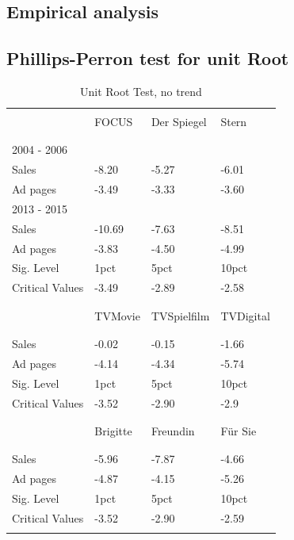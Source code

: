 \documentclass[12pt,a4paper,notitlepage]{article}
\begin{document}
\begin{appendices}

\section{Empirical analysis}

\subsection{Phillips-Perron test for unit Root}


\begin{table}[!htbp]\centering 
  \caption{Unit Root Test, no trend} 
  \label{tab_uroot} 
\begin{tabular}{@{\extracolsep{5pt}} llll} 
\\[-1.8ex]\hline 
\hline \\[-1.8ex] 
 & FOCUS & Der Spiegel & Stern \\ 
\\[-1.8ex]\hline 
\hline \\[-1.8ex] 
2004 - 2006 \\
\hline
Sales & -8.20 & -5.27 & -6.01 \\ 
Ad pages & -3.49 & -3.33 & -3.60 \\ 
\hline
2013 - 2015 \\
\hline
Sales & -10.69 & -7.63 & -8.51 \\ 
Ad pages & -3.83 & -4.50 & -4.99 \\ 
\hline
Sig. Level & 1pct & 5pct & 10pct \\ 
Critical Values & -3.49 & -2.89 & -2.58 \\ 
\\[-1.8ex]\hline 
\hline \\[-1.8ex] 
 & TVMovie & TVSpielfilm & TVDigital \\ 
\\[-1.8ex]\hline 
\hline \\[-1.8ex] 
Sales & -0.02 & -0.15 & -1.66 \\ 
Ad pages & -4.14 & -4.34 & -5.74 \\
\hline 
Sig. Level & 1pct & 5pct & 10pct \\ 
Critical Values & -3.52 & -2.90 & -2.9 \\ 
\\[-1.8ex]\hline 
\hline \\[-1.8ex] 
 & Brigitte & Freundin & Für Sie \\ 
\\[-1.8ex]\hline 
\hline \\[-1.8ex] 
Sales & -5.96 & -7.87 & -4.66 \\ 
Ad pages & -4.87 & -4.15 & -5.26 \\ 
\hline
Sig. Level & 1pct & 5pct & 10pct \\ 
Critical Values & -3.52 & -2.90 & -2.59 \\ 
\hline \\[-1.8ex] 
\end{tabular} 
\end{table} 


\end{appendices}
\end{document}
